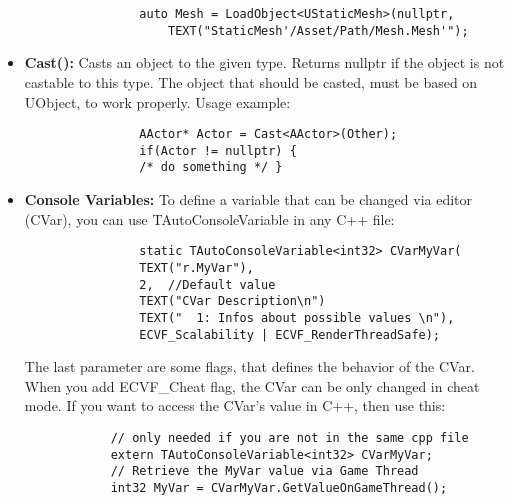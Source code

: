 \documentclass[10pt,a4paper]{article}
\begin{document}
\begin{multicols*}{2}
\begin{itemize}
			\begin{verbatim}
				auto Mesh = LoadObject<UStaticMesh>(nullptr,
				    TEXT("StaticMesh'/Asset/Path/Mesh.Mesh'");
			\end{verbatim}
			\item \textbf{Cast():} Casts an object to the given type. Returns nullptr if the object is not castable to this type. The object that should be casted, must be based on UObject, to work properly.
			Usage example:
			\begin{verbatim}
				AActor* Actor = Cast<AActor>(Other);
				if(Actor != nullptr) {
				/* do something */ }
			\end{verbatim}
			\item \textbf{Console Variables:} To define a variable that can be changed via editor (CVar), you can use TAutoConsoleVariable in any C++ file:
			\begin{verbatim}
				static TAutoConsoleVariable<int32> CVarMyVar(
				TEXT("r.MyVar"),
				2,	//Default value
				TEXT("CVar Description\n")
				TEXT("  1: Infos about possible values \n"),
				ECVF_Scalability | ECVF_RenderThreadSafe);
			\end{verbatim}
			The last parameter are some flags, that defines the behavior of the CVar. When you add ECVF\_Cheat flag, the CVar can be only changed in cheat mode. If you want to access the CVar's value in C++, then use this:
			\begin{verbatim}
			// only needed if you are not in the same cpp file
			extern TAutoConsoleVariable<int32> CVarMyVar;
			// Retrieve the MyVar value via Game Thread
			int32 MyVar = CVarMyVar.GetValueOnGameThread();
			\end{verbatim}
	\end{itemize}


\end{multicols*}
\end{document}
